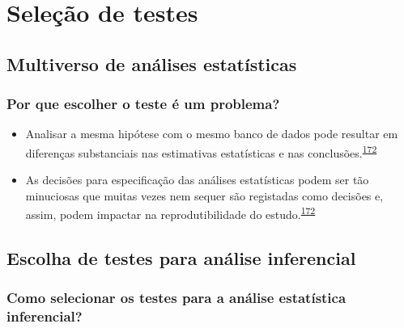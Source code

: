 \documentclass[
  a4paper,
]{book}
\begin{document}
\hypertarget{selecao-testes}{%
\chapter{\texorpdfstring{\textbf{Seleção de testes}}{Seleção de testes}}\label{selecao-testes}}

\hypertarget{multiverso-estatistica}{%
\section{Multiverso de análises estatísticas}\label{multiverso-estatistica}}

\hypertarget{por-que-escolher-o-teste-uxe9-um-problema}{%
\subsection{Por que escolher o teste é um problema?}\label{por-que-escolher-o-teste-uxe9-um-problema}}

\begin{itemize}
\item
  Analisar a mesma hipótese com o mesmo banco de dados pode resultar em diferenças substanciais nas estimativas estatísticas e nas conclusões.\textsuperscript{\protect\hyperlink{ref-Breznau2022}{172}}
\item
  As decisões para especificação das análises estatísticas podem ser tão minuciosas que muitas vezes nem sequer são registadas como decisões e, assim, podem impactar na reprodutibilidade do estudo.\textsuperscript{\protect\hyperlink{ref-Breznau2022}{172}}
\end{itemize}

\hypertarget{escolha-analise-inferencial}{%
\section{Escolha de testes para análise inferencial}\label{escolha-analise-inferencial}}

\hypertarget{como-selecionar-os-testes-para-a-anuxe1lise-estatuxedstica-inferencial}{%
\subsection{Como selecionar os testes para a análise estatística inferencial?}\label{como-selecionar-os-testes-para-a-anuxe1lise-estatuxedstica-inferencial}}
\end{document}
